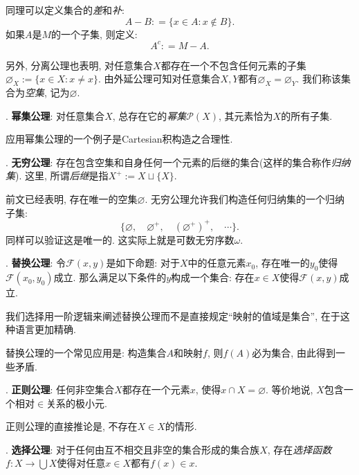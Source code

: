 同理可以定义集合的\textit{差}和\textit{补}: $$A - B : = \{ x \in A :  x \notin B \}.$$
如果$A$是$M$的一个子集, 则定义: $$A^c : = M - A.$$

另外, 分离公理也表明, 对任意集合$X$都存在一个不包含任何元素的子集$\varnothing _X:=\{ x \in X:x \neq x \}$. 由外延公理可知对任意集合$X, Y$都有$\varnothing _X = \varnothing _Y$. 我们称该集合为\textit{空集}, 记为$\varnothing$. 

\vspace{0.5em}
. \textbf{幂集公理}: 对任意集合$X$, 总存在它的\textit{幂集}$\mathcal{P}(X)$, 其元素恰为$X$的所有子集. 

应用幂集公理的一个例子是Cartesian积构造之合理性. 

\vspace{0.5em}
. \textbf{无穷公理}: 存在包含空集和自身任何一个元素的后继的集合(这样的集合称作\textit{归纳集}). 这里, 所谓\textit{后继}是指$X^{+}:=X \sqcup \{ X \}$. 

前文已经表明, 存在唯一的空集$\varnothing$. 无穷公理允许我们构造任何归纳集的一个归纳子集: $$\{ \varnothing ,\quad \varnothing ^+ ,\quad (\varnothing ^+)^+, \quad \cdots \} .$$
同样可以验证这是唯一的. 这实际上就是可数无穷序数$\omega$. 

\vspace{0.5em}
. \textbf{替换公理}: 令$\mathcal{F}(x, y)$是如下命题: 对于$X$中的任意元素$x_0$, 存在唯一的$y_0$使得$\mathcal{F}(x_0, y_0)$成立. 那么满足以下条件的$y$构成一个集合: 存在$x \in X$使得$\mathcal{F}(x, y)$成立. 

我们选择用一阶逻辑来阐述替换公理而不是直接规定“映射的值域是集合”, 在于这种语言更加精确. 

替换公理的一个常见应用是: 构造集合$A$和映射$f$, 则$f(A)$必为集合, 由此得到一些矛盾. 

\vspace{0.5em}
. \textbf{正则公理}: 任何非空集合$X$都存在一个元素$x$, 使得$x \cap X = \varnothing$. 等价地说, $X$包含一个相对$\in $关系的极小元. 

正则公理的直接推论是, 不存在$X \in X$的情形. 

\vspace{0.5em}
. \textbf{选择公理}: 对于任何由互不相交且非空的集合形成的集合族$X$, 存在\textit{选择函数}$f:X \to \bigcup X$使得对任意$x \in X$都有$f(x)\in x$. 


